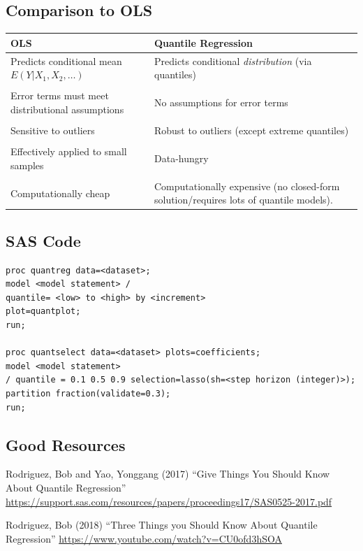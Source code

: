 \documentclass[12pt]{notes}
\begin{document}
\subsection{Comparison to OLS}
\begin{tabular}{|p{9cm}|p{9cm}|}
\hline
\textbf{OLS} & \textbf{Quantile Regression} \\ 
\hline
Predicts conditional mean $E(Y|X_1, X_2, \ldots)$ & Predicts conditional \textit{distribution} (via quantiles) \\
& \\
Error terms must meet distributional assumptions & No assumptions for error terms \\
& \\
Sensitive to outliers  & Robust to outliers (except extreme quantiles) \\
& \\
Effectively applied to small samples & Data-hungry \\
& \\
Computationally cheap & Computationally expensive (no closed-form solution/requires lots of quantile models). \\
\hline
\end{tabular}

\subsection{SAS Code}
\begin{verbatim}
proc quantreg data=<dataset>;
model <model statement> /
quantile= <low> to <high> by <increment>
plot=quantplot;
run;

proc quantselect data=<dataset> plots=coefficients;
model <model statement>
/ quantile = 0.1 0.5 0.9 selection=lasso(sh=<step horizon (integer)>);
partition fraction(validate=0.3);
run;
\end{verbatim}








\subsection{Good Resources}
\bi
\item Rodriguez, Bob and Yao, Yonggang (2017) “Give Things You Should Know About Quantile Regression” \url{https://support.sas.com/resources/papers/proceedings17/SAS0525-2017.pdf} 
\item Rodriguez, Bob (2018) “Three Things you Should Know About Quantile Regression” \url{https://www.youtube.com/watch?v=CU0ofd3hSOA} 
\ei
\end{document}
